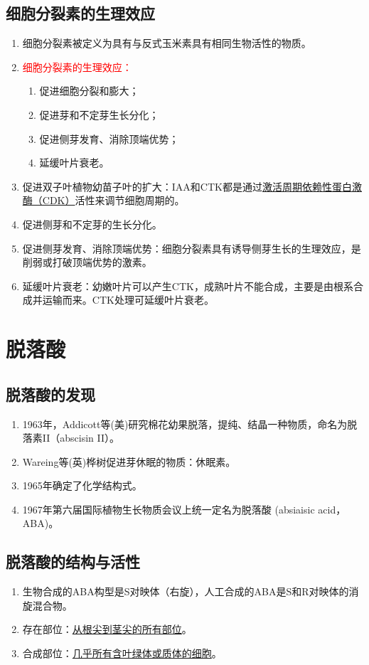 \subsection{细胞分裂素的生理效应}
\begin{enumerate}
    \item 细胞分裂素被定义为具有与反式玉米素具有相同生物活性的物质。
    \item \textcolor{red}{细胞分裂素的生理效应：}
    \begin{enumerate}
        \item 促进细胞分裂和膨大；
        \item 促进芽和不定芽生长分化；
        \item 促进侧芽发育、消除顶端优势；
        \item 延缓叶片衰老。
    \end{enumerate}
    \item 促进双子叶植物幼苗子叶的扩大：IAA和CTK都是通过\uline{激活周期依赖性蛋白激酶（CDK）}活性来调节细胞周期的。
    \item 促进侧芽和不定芽的生长分化。
    \item 促进侧芽发育、消除顶端优势：细胞分裂素具有诱导侧芽生长的生理效应，是削弱或打破顶端优势的激素。
    \item 延缓叶片衰老：幼嫩叶片可以产生CTK，成熟叶片不能合成，主要是由根系合成并运输而来。CTK处理可延缓叶片衰老。
\end{enumerate}

\section{脱落酸}
\subsection{脱落酸的发现}
\begin{enumerate}
    \item 1963年，Addicott等(美)研究棉花幼果脱落，提纯、结晶一种物质，命名为脱落素II（abscisin II）。
    \item Wareing等(英)桦树促进芽休眠的物质：休眠素。
    \item 1965年确定了化学结构式。
    \item 1967年第六届国际植物生长物质会议上统一定名为脱落酸 (absiaisic acid，ABA)。
\end{enumerate}
\subsection{脱落酸的结构与活性}
\begin{enumerate}
    \item 生物合成的ABA构型是S对映体（右旋），人工合成的ABA是S和R对映体的消旋混合物。
    \item 存在部位：\uline{从根尖到茎尖的所有部位}。
    \item 合成部位：\uline{几乎所有含叶绿体或质体的细胞}。
\end{enumerate}
